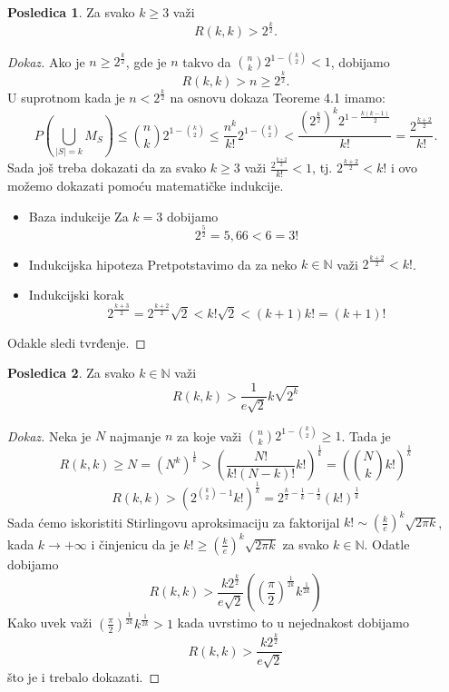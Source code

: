 \documentclass{article}
\theoremstyle{definition}
\newtheorem{posledica}{Posledica}[teorema]
\newcommand{\dokaz}[1]{\begin{proof}[Dokaz]#1\end{proof}}
\begin{document}
	\begin{posledica}\label{pos1}
	Za svako $k \geq 3$ važi $$R(k,k) > 2^{\frac{k}{2}}.$$
	\dokaz{
		Ako je $n \geq 2^{\frac{k}{2}}$, gde je $n$ takvo da $\binom{n}{k}2^{1 - \binom{k}{2}} < 1$, dobijamo
		$$R(k,k) > n \geq 2^{\frac{k}{2}}.$$
		U suprotnom kada je $n <  2^{\frac{k}{2}}$ na osnovu dokaza Teoreme 4.1 imamo:
		$$ P(\bigcup_{|S|=k}M_S) \leq \binom{n}{k}2^{1 - \binom{k}{2}} \leq \frac{n^k}{k!}2^{1 - \binom{k}{2}} < 
		\frac{(2^{\frac{k}{2}})^k 2^{1 - \frac{k(k - 1)}{2}}}{k!} = \frac{2^{\frac{k + 2}{2}}}{k!}.$$Sada još treba dokazati da za svako $k \geq 3$ važi
		$\frac{2^{\frac{k + 2}{2}}}{k!} < 1$, tj. $2^{\frac{k + 2}{2}} < k!$ i ovo možemo dokazati pomoću matematičke indukcije.
		\begin{itemize}
			\item Baza indukcije \newline
				Za $k = 3$ dobijamo $$2^{\frac{5}{2}} = 5,66 < 6 = 3!$$
			\item Indukcijska hipoteza \newline
				Pretpotstavimo da za neko $k \in \mathbb{N}$ važi $2^{\frac{k + 2}{2}} < k!$.
			\item Indukcijski korak \newline
				$$2^{\frac{k + 3}{2}} = 2^{\frac{k + 2}{2}}\sqrt{2} < k!\sqrt{2} < (k + 1)k! = (k + 1)!$$
		\end{itemize}
		Odakle sledi tvrđenje.
	}
	\end{posledica}
	\begin{posledica}\label{pos2}
		Za svako $k \in \mathbb{N}$ važi $$R(k,k) > \frac{1}{e\sqrt{2}}k\sqrt{2^k}$$
		\dokaz{
			Neka je $N$ najmanje $n$ za koje važi $\binom{n}{k}2^{1 - \binom{k}{2}} \geq 1$. Tada je 
			$$R(k,k) \geq N = (N^k)^{\frac{1}{k}} > \left(\frac{N!}{k!(N - k)!}k!\right)^{\frac{1}{k}} = \left(\binom{N}{k}k!\right)^{\frac{1}{k}}$$
			$$R(k,k) > \left(2^{\binom{k}{2} - 1}k!\right)^{\frac{1}{k}} = 2^{\frac{k}{2} - \frac{1}{k} - \frac{1}{2}}(k!)^{\frac{1}{k}}$$
			Sada ćemo iskoristiti Stirlingovu aproksimaciju za faktorijal $k! \sim \left(\frac{k}{e}\right)^k\sqrt{2\pi k}$, kada $k \longrightarrow +\infty$ 
			i činjenicu da je $k! \geq \left(\frac{k}{e}\right)^k\sqrt{2\pi k}$ za svako $k \in \mathbb{N}$. Odatle dobijamo
			$$R(k,k) > \frac{k 2^{\frac{k}{2}}}{e\sqrt{2}}\left(\left(\frac{\pi}{2}\right)^{\frac{1}{2k}}k^{\frac{1}{2k}}\right)$$
			Kako uvek važi $\left(\frac{\pi}{2}\right)^{\frac{1}{2k}}k^{\frac{1}{2k}} > 1$ kada uvrstimo to u nejednakost dobijamo
			$$R(k,k) > \frac{k 2^{\frac{k}{2}}}{e\sqrt{2}}$$ što  je i trebalo dokazati.
		}
	\end{posledica}
\end{document}
